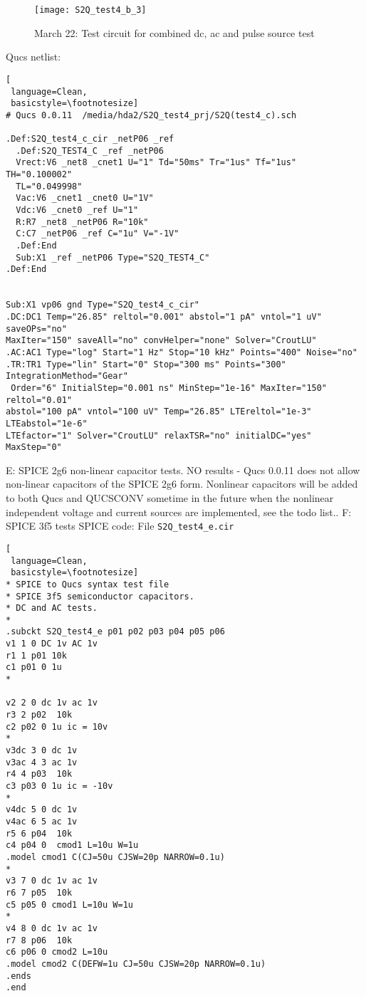 \begin{figure}
  \centering
  \texttt{[image: S2Q\_test4\_b\_3]}
  \caption{March 22: Test circuit for combined dc, ac and pulse source test}
  \label{fig:S2Qtest4_6}
\end{figure} 

\newpage 
Qucs netlist:
\begin{lstlisting}[
 language=Clean, 
 basicstyle=\footnotesize]
# Qucs 0.0.11  /media/hda2/S2Q_test4_prj/S2Q(test4_c).sch

.Def:S2Q_test4_c_cir _netP06 _ref
  .Def:S2Q_TEST4_C _ref _netP06
  Vrect:V6 _net8 _cnet1 U="1" Td="50ms" Tr="1us" Tf="1us" TH="0.100002" 
  TL="0.049998"
  Vac:V6 _cnet1 _cnet0 U="1V"
  Vdc:V6 _cnet0 _ref U="1"
  R:R7 _net8 _netP06 R="10k"
  C:C7 _netP06 _ref C="1u" V="-1V"
  .Def:End
  Sub:X1 _ref _netP06 Type="S2Q_TEST4_C"
.Def:End


Sub:X1 vp06 gnd Type="S2Q_test4_c_cir"
.DC:DC1 Temp="26.85" reltol="0.001" abstol="1 pA" vntol="1 uV" saveOPs="no" 
MaxIter="150" saveAll="no" convHelper="none" Solver="CroutLU"
.AC:AC1 Type="log" Start="1 Hz" Stop="10 kHz" Points="400" Noise="no"
.TR:TR1 Type="lin" Start="0" Stop="300 ms" Points="300" IntegrationMethod="Gear"
 Order="6" InitialStep="0.001 ns" MinStep="1e-16" MaxIter="150" reltol="0.01" 
abstol="100 pA" vntol="100 uV" Temp="26.85" LTEreltol="1e-3" LTEabstol="1e-6" 
LTEfactor="1" Solver="CroutLU" relaxTSR="no" initialDC="yes" MaxStep="0"

\end{lstlisting} 






\begin{flushleft}
E: SPICE 2g6 non-linear capacitor tests.
\linebreak 
NO results - Qucs 0.0.11 does  not allow non-linear capacitors of the SPICE 2g6 form.  Nonlinear capacitors will be added to both Qucs and QUCSCONV sometime in the future when the nonlinear independent voltage and current sources are implemented, see the todo list..
\vspace*{5mm}
\linebreak
F: SPICE 3f5 tests
SPICE code: File \verb|S2Q_test4_e.cir|

\begin{lstlisting}[
 language=Clean, 
 basicstyle=\footnotesize]
* SPICE to Qucs syntax test file 
* SPICE 3f5 semiconductor capacitors.
* DC and AC tests.
*
.subckt S2Q_test4_e p01 p02 p03 p04 p05 p06
v1 1 0 DC 1v AC 1v
r1 1 p01 10k
c1 p01 0 1u
*

v2 2 0 dc 1v ac 1v
r3 2 p02  10k
c2 p02 0 1u ic = 10v
*
v3dc 3 0 dc 1v
v3ac 4 3 ac 1v
r4 4 p03  10k
c3 p03 0 1u ic = -10v
*
v4dc 5 0 dc 1v
v4ac 6 5 ac 1v
r5 6 p04  10k
c4 p04 0  cmod1 L=10u W=1u 
.model cmod1 C(CJ=50u CJSW=20p NARROW=0.1u)
*
v3 7 0 dc 1v ac 1v
r6 7 p05  10k
c5 p05 0 cmod1 L=10u W=1u
*
v4 8 0 dc 1v ac 1v
r7 8 p06  10k
c6 p06 0 cmod2 L=10u
.model cmod2 C(DEFW=1u CJ=50u CJSW=20p NARROW=0.1u)
.ends
.end
\end{lstlisting} 
\end{flushleft}

